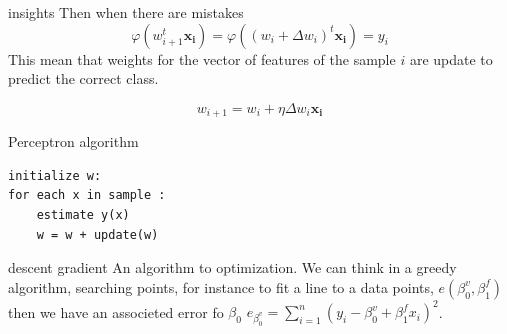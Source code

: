 \documentclass{beamer}
\begin{document}
\begin{frame}{insights}
Then when there are mistakes 
\begin{equation}
\varphi(w^{t}_{i+1} \mathbf{x_{i}}) =\varphi((w_{i} + \Delta w_{i})^{t} \mathbf{ x_{i}}) = y_{i} 
\end{equation}
This mean that  weights for the vector of features of the sample $i$ are update to predict the correct class.
 
\begin{equation}
w_{i+1} = w_{i} + \eta \Delta w_{i} \mathbf{x_{i}}
\end{equation}

\end{frame}


\begin{frame}[fragile]{Perceptron algorithm}
\begin{verbatim}
initialize w:
for each x in sample :
	estimate y(x)
	w = w + update(w)
\end{verbatim}
\end{frame}






\begin{frame}{descent gradient}
An algorithm to optimization.
We can think in a greedy algorithm, searching points, for instance to fit a line to a data points, 
$e(\beta_{0}^{v}, \beta_{1}^{f})$
then we have an associeted error fo $\beta_{0}$ $e_{\beta_{0}^{v}} =\sum_{i=1}^{n} (y_{i} - \beta_{0}^{v}+ \beta_{1}^{f}x_{i} )^{2}$. 
\end{frame}
\end{document}
